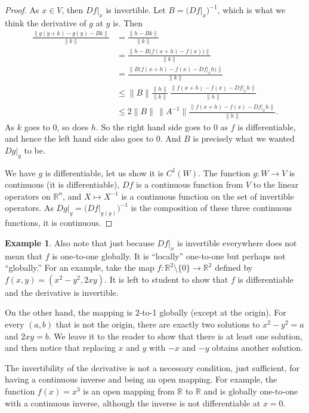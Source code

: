 \documentclass[12pt,openany]{book}
\newcommand{\snorm}[1]{\lVert {#1} \rVert}
\newcommand{\R}{{\mathbb{R}}}
\theoremstyle{plain}
\theoremstyle{remark}
\theoremstyle{definition}
\theoremstyle{exercise}
\theoremstyle{example}
\newtheorem{example}[thm]{Example}
\begin{document}
\begin{proof}
As $x \in V$, then $Df|_x$ is invertible.
Let $B = \bigl(Df|_x\bigr)^{-1}$, which is what we think the derivative of
$g$ at $y$ is.  Then
\begin{equation*}
\begin{split}
\frac{\snorm{g(y+k)-g(y)-Bk}}{\snorm{k}}
& =
\frac{\snorm{h-Bk}}{\snorm{k}}
\\
& =
\frac{\snorm{h-B\bigl(f(x+h)-f(x)\bigr)}}{\snorm{k}}
\\
& =
\frac{\snorm{B\bigl(f(x+h)-f(x)-Df|_x h\bigr)}}{\snorm{k}}
\\
& \leq
\snorm{B}
\frac{\snorm{h}}{\snorm{k}}\,
\frac{\snorm{f(x+h)-f(x)-Df|_x h}}{\snorm{h}}
\\
& \leq
2\snorm{B} \, \snorm{A^{-1}}
\frac{\snorm{f(x+h)-f(x)-Df|_x h}}{\snorm{h}} .
\end{split}
\end{equation*}
As $k$ goes to $0$, so does $h$.  So the right hand side goes to $0$ as $f$ is
differentiable, and hence
the left hand side also goes to $0$.  And
$B$ is precisely what we wanted $Dg|_y$ to be.

We have $g$ is differentiable, let us show it is $C^1(W)$.
The function $g \colon W \to V$ is continuous (it is differentiable),
$Df$ is a continuous function from $V$
to the linear operators on $\R^n$,
and $X \mapsto X^{-1}$ is a continuous function on
the set of invertible operators.
As
$Dg|_y = {\bigl( Df|_{g(y)}\bigr)}^{-1}$ is the composition
of these three
continuous functions, it is continuous.
\end{proof}

\begin{example}
Also note that just because $Df|_x$ is invertible everywhere does not
mean that $f$ is
one-to-one globally.  It is ``locally'' one-to-one but perhaps not
``globally.''  For an
example, take the map $f \colon \R^2 \setminus \{ 0 \} \to \R^2$ defined
by $f(x,y) = (x^2-y^2,2xy)$.
It is left to student to show that $f$ is
differentiable and the derivative is invertible.

On the other hand, the mapping is 2-to-1 globally (except at the origin).
For every
$(a,b)$ that is not the origin, there are exactly two
solutions to $x^2-y^2=a$ and $2xy=b$.  We leave it to the reader
to show that there is at least one solution, and then notice
that replacing $x$ and $y$ with $-x$ and $-y$ obtains another solution.
\end{example}

The invertibility of the derivative is not a necessary
condition, just sufficient, for having a continuous inverse and being an open
mapping.  For example, the function $f(x) = x^3$ is an open mapping from $\R$
to $\R$ and is globally one-to-one with a continuous inverse, although the
inverse is not differentiable at $x=0$.
\end{document}
